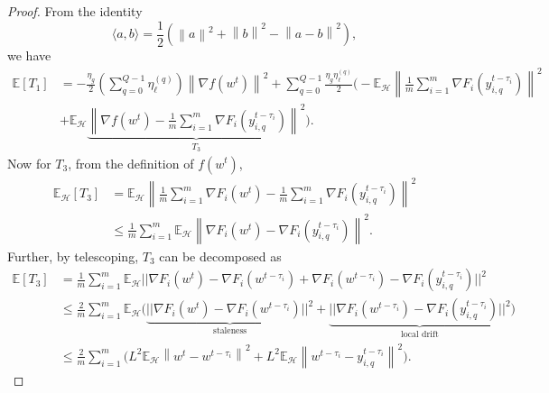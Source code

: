 \documentclass[twoside]{article}
\newcommand{\norm}[1]{\left\lVert#1\right\rVert}
\begin{document}
\begin{proof}
From the identity 
$$\langle a, b \rangle = \frac{1}{2}(\norm{a}^2 + \norm{b}^2 - \norm{a-b}^2),$$
we have
\begin{equation}
    \begin{aligned}
        \mathbb{E}[T_1] 
        &= -\frac{ \eta_g}{2}\left(\sum_{q=0}^{Q-1} \eta^{(q)}_{\ell} \right) \norm{\nabla f(w^t)}^2 + \sum_{q=0}^{Q-1} \frac{ \eta_g \eta^{(q)}_{\ell}}{2} \Big(-\mathbb{E}_{\mathcal{H}} \norm{\frac{1}{m}\sum_{i=1}^m \nabla F_i(y^{t-\tau_i}_{i,q})}^2 \\ &+\mathbb{E}_{\mathcal{H}}  \underbrace{\norm{\nabla f(w^t) -  \frac{1}{m}\sum_{i=1}^m \nabla F_i(y^{t-\tau_i}_{i,q})}^2 }_{T_3} \Big).
    \end{aligned}
    \label{eq:T1}
\end{equation}
Now for $T_3$, from the definition of $f(w^t)$,
\begin{equation}
    \begin{aligned}
        \mathbb{E}_{\mathcal{H}}[T_3] &= \mathbb{E}_{\mathcal{H}}\norm{ \frac{1}{m}\sum_{i=1}^m  \nabla F_i(w^t) -  \frac{1}{m}\sum_{i=1}^m \nabla F_i(y^{t-\tau_i}_{i,q})}^2 \\
        &\leq \frac{1}{m} \sum_{i=1}^m \mathbb{E}_{\mathcal{H}}\norm{\nabla F_i(w^t) - \nabla F_i(y^{t-\tau_i}_{i,q})}^2.
    \end{aligned}
\end{equation}
Further, by telescoping, $T_3$ can be decomposed as
\begin{equation}
    \begin{aligned}
        \mathbb{E}[T_3] &= \frac{1}{m}\sum_{i=1}^m \mathbb{E}_{\mathcal{H}} \Big|\Big|\nabla F_i(w^t) - \nabla F_i(w^{t-\tau_i}) + \nabla F_i(w^{t-\tau_i}) - \nabla F_i(y^{t-\tau_i}_{i,q}) \Big|\Big|^2\\
        &\leq \frac{2}{m}\sum_{i=1}^m \mathbb{E}_{\mathcal{H}} \Big( \underbrace{\Big|\Big|\nabla F_i(w^t) - \nabla F_i(w^{t-\tau_i})\Big|\Big|^2}_{\text{staleness}} + \underbrace{\Big|\Big|\nabla F_i(w^{t-\tau_i}) - \nabla F_i(y^{t-\tau_i}_{i,q})\Big|\Big|^2}_{\text{local drift}} \Big) \\
        &\leq \frac{2}{m}\sum_{i=1}^m \Big( L^2 \mathbb{E}_{\mathcal{H}}\norm{w^t - w^{t-\tau_i}}^2 + L^2\mathbb{E}_{\mathcal{H}}\norm{w^{t-\tau_i} - y^{t-\tau_i}_{i,q}}^2 \Big).
    \end{aligned}
\end{equation}


\end{proof}
\end{document}
